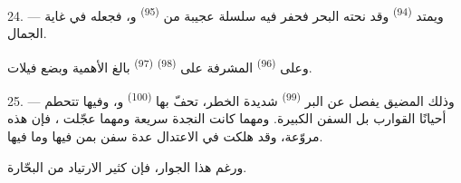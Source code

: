 \VUsaut{3.0mm}
\VUsaut{3.0mm}

24. --- ويمتد  \textsuperscript{(94)} وقد نحته البحر فحفر فيه
سلسلة عجيبة من  \textsuperscript{(95)} و، فجعله
في غاية الجمال.

وعلى  \textsuperscript{(96)} المشرفة على 
\textsuperscript{(98)}  \textsuperscript{(97)} بالغ الأهمية وبضع فيلات.

25. --- وذلك المضيق يفصل عن البر  \textsuperscript{(99)} شديدة
الخطر، تحفّ بها  \textsuperscript{(100)} و، وفيها
تتحطم أحيانًا القوارب بل السفن الكبيرة. ومهما كانت النجدة سريعة ومهما
عجّلت ، فإن هذه  مروّعة، وقد
هلكت في  الاعتدال عدة سفن بمن فيها وما فيها.

ورغم هذا الجوار، فإن  كثير الارتياد من البحّارة.
\VUsaut{6.0mm}
\VUfilet{22mm}
